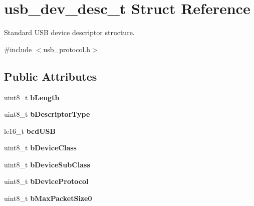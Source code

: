 \hypertarget{structusb__dev__desc__t}{\section{usb\-\_\-dev\-\_\-desc\-\_\-t Struct Reference}
\label{structusb__dev__desc__t}
}


Standard U\-S\-B device descriptor structure.  




{\ttfamily \#include $<$usb\-\_\-protocol.\-h$>$}

\subsection*{Public Attributes}
\begin{DoxyCompactItemize}
\item 
\hypertarget{structusb__dev__desc__t_af4db977f6cd877847a47fc2c9f23507d}{uint8\-\_\-t {\bfseries b\-Length}}\label{structusb__dev__desc__t_af4db977f6cd877847a47fc2c9f23507d}

\item 
\hypertarget{structusb__dev__desc__t_a840d4136b9b6662fb2bab49053949c1b}{uint8\-\_\-t {\bfseries b\-Descriptor\-Type}}\label{structusb__dev__desc__t_a840d4136b9b6662fb2bab49053949c1b}

\item 
\hypertarget{structusb__dev__desc__t_a45f7d74df9688a10a41a69de613d0191}{le16\-\_\-t {\bfseries bcd\-U\-S\-B}}\label{structusb__dev__desc__t_a45f7d74df9688a10a41a69de613d0191}

\item 
\hypertarget{structusb__dev__desc__t_a64f6606c681beb18f1d13d701d1264c2}{uint8\-\_\-t {\bfseries b\-Device\-Class}}\label{structusb__dev__desc__t_a64f6606c681beb18f1d13d701d1264c2}

\item 
\hypertarget{structusb__dev__desc__t_a49aec064889f05135fdf38bc94e41c47}{uint8\-\_\-t {\bfseries b\-Device\-Sub\-Class}}\label{structusb__dev__desc__t_a49aec064889f05135fdf38bc94e41c47}

\item 
\hypertarget{structusb__dev__desc__t_a7247d3a045b2fc63569651cfeb059401}{uint8\-\_\-t {\bfseries b\-Device\-Protocol}}\label{structusb__dev__desc__t_a7247d3a045b2fc63569651cfeb059401}

\item 
\hypertarget{structusb__dev__desc__t_a382212d11df623e7c4b7d4787892f551}{uint8\-\_\-t {\bfseries b\-Max\-Packet\-Size0}}\label{structusb__dev__desc__t_a382212d11df623e7c4b7d4787892f551}


\end{DoxyCompactItemize}
